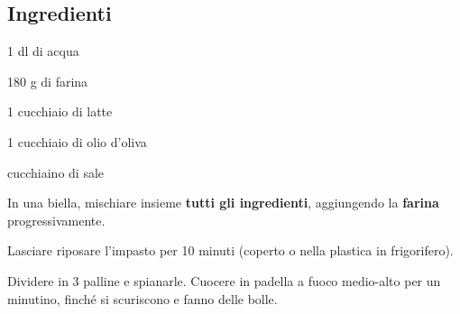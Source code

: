 \newpage
{}

\subsection*{Ingredienti}
\begin{ingredients}
	\item 1 dl di acqua
	\item 180 g di farina
	\item 1 cucchiaio di latte
	\item 1 cucchiaio di olio d'oliva
	\item {} cucchiaino di sale
\end{ingredients}


\medskip

In una biella, mischiare insieme \textbf{tutti gli ingredienti}, aggiungendo la \textbf{farina} progressivamente. 

Lasciare riposare l'impasto per 10 minuti (coperto o nella plastica in frigorifero).

Dividere in 3 palline e spianarle. Cuocere in padella a fuoco medio-alto per un minutino, finché si scuriscono e fanno delle bolle. 


\vspace*{0.75 cm}

\begin{recipeblock}
	
\end{recipeblock}